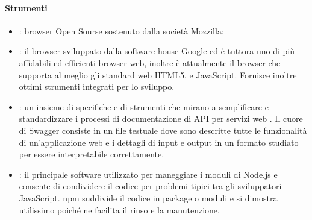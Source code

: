 \documentclass[../NormeDiProgetto_v4.0.0.tex]{subfiles}
\begin{document}
			\paragraph{Strumenti}
			\begin{itemize}
				\item \textbf{}: browser Open Sourse sostenuto dalla società Mozzilla;

				\item \textbf{}: il browser sviluppato dalla software house Google ed è tuttora uno di più affidabili ed efficienti browser web, inoltre è attualmente il browser che supporta al meglio gli standard web HTML5,  e JavaScript. Fornisce inoltre ottimi strumenti integrati per lo sviluppo.

				\item \textbf{}: un insieme di specifiche e di strumenti che mirano a semplificare e standardizzare i processi di documentazione di API per servizi web . Il cuore di Swagger consiste in un file testuale dove sono descritte tutte le funzionalità di un'applicazione web e i dettagli di input e output in un formato studiato per essere interpretabile correttamente.

				\item \textbf{}: il principale software utilizzato per maneggiare i moduli di Node.js e consente di condividere il codice per problemi tipici tra gli sviluppatori JavaScript. npm suddivide il codice in package o moduli e si dimostra utilissimo poiché ne facilita il riuso e la manutenzione.


			


\end{itemize}
\end{document}
